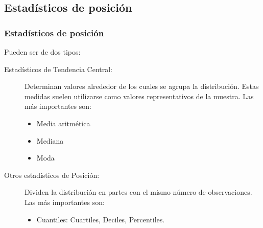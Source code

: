 \subsection{Estadísticos de posición}

\begin{frame}
\frametitle{Estadísticos de posición}
Pueden ser de dos tipos:
\begin{description}
\item[Estadísticos de Tendencia Central:] Determinan valores alrededor de los cuales se agrupa la distribución. Estas
medidas suelen utilizarse como valores representativos de la muestra. Las más importantes son:
\begin{itemize}
\item Media aritmética
\item Mediana
\item Moda
\end{itemize}
\item [Otros estadísticos de Posición:] Dividen la distribución en partes con el mismo número de observaciones. Las más importantes son:
\begin{itemize}
\item Cuantiles: Cuartiles, Deciles, Percentiles.
\end{itemize}
\end{description}
\end{frame}


